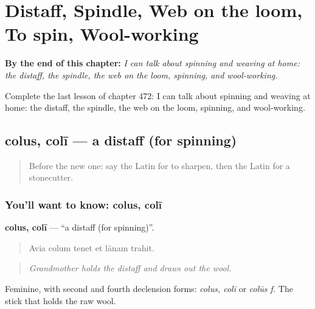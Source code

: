 
\chapter{Distaff, Spindle, Web on the loom, To spin, Wool-working}
\label{ch:la-distaff-spindle-web-on-the-loom-to-spin-wool-working}

\begin{chapteropening}
\textbf{By the end of this chapter:} \emph{I can talk about spinning and weaving at home: the distaff, the spindle, the web on the loom, spinning, and wool-working.}

Complete the last lesson of chapter 472: I can talk about spinning and weaving at home: the distaff, the spindle, the web on the loom, spinning, and wool-working.
\end{chapteropening}

\section[colus, colī]{colus, colī — a distaff (for spinning)}

\label{lesson:LA-C472-colus}



\begin{quote}
Before the new one: say the Latin for to sharpen, then the Latin for a stonecutter.
\end{quote}

\subsection*{You'll want to know: colus, colī}
\textbf{colus, colī} — \textquotedblleft{}a distaff (for spinning)\textquotedblright{}.

\begin{quote}
Avia colum tenet et lānam trahit.
\end{quote}

\begin{quote}
\emph{Grandmother holds the distaff and draws out the wool.}
\end{quote}

Feminine, with second and fourth declension forms: \emph{colus, colī} or \emph{colūs f.} The stick that holds the raw wool.

